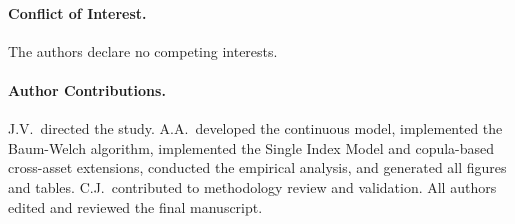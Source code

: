 \paragraph{Conflict of Interest.}
The authors declare no competing interests.

\paragraph{Author Contributions.}
J.V.\ directed the study.
A.A.\ developed the continuous model, implemented the Baum-Welch algorithm, implemented the Single Index Model and copula-based cross-asset extensions, conducted the empirical analysis, and generated all figures and tables.
C.J.\ contributed to methodology review and validation.
All authors edited and reviewed the final manuscript.
